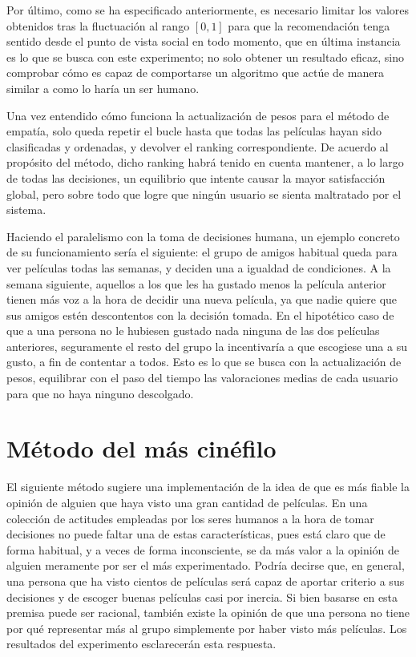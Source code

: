 Por último, como se ha especificado anteriormente, es necesario limitar los valores obtenidos tras la fluctuación al rango $[0,1]$ para que la recomendación tenga sentido desde el punto de vista social en todo momento, que en última instancia es lo que se busca con este experimento; no solo obtener un resultado eficaz, sino comprobar cómo es capaz de comportarse un algoritmo que actúe de manera similar a como lo haría un ser humano.

Una vez entendido cómo funciona la actualización de pesos para el método de empatía, solo queda repetir el bucle hasta que todas las películas hayan sido clasificadas y ordenadas, y devolver el ranking correspondiente. De acuerdo al propósito del método, dicho ranking habrá tenido en cuenta mantener, a lo largo de todas las decisiones, un equilibrio que intente causar la mayor satisfacción global, pero sobre todo que logre que ningún usuario se sienta maltratado por el sistema.

Haciendo el paralelismo con la toma de decisiones humana, un ejemplo concreto de su funcionamiento sería el siguiente: el grupo de amigos habitual queda para ver películas todas las semanas, y deciden una a igualdad de condiciones. A la semana siguiente, aquellos a los que les ha gustado menos la película anterior tienen más voz a la hora de decidir una nueva película, ya que nadie quiere que sus amigos estén descontentos con la decisión tomada. En el hipotético caso de que a una persona no le hubiesen gustado nada ninguna de las dos películas anteriores, seguramente el resto del grupo la incentivaría a que escogiese una a su gusto, a fin de contentar a todos. Esto es lo que se busca con la actualización de pesos, equilibrar con el paso del tiempo las valoraciones medias de cada usuario para que no haya ninguno descolgado.

\section{Método del más cinéfilo}

El siguiente método sugiere una implementación de la idea de que es más fiable la opinión de alguien que haya visto una gran cantidad de películas. En una colección de actitudes empleadas por los seres humanos a la hora de tomar decisiones no puede faltar una de estas características, pues está claro que de forma habitual, y a veces de forma inconsciente, se da más valor a la opinión de alguien meramente por ser el más experimentado. Podría decirse que, en general, una persona que ha visto cientos de películas será capaz de aportar criterio a sus decisiones y de escoger buenas películas casi por inercia. Si bien basarse en esta premisa puede ser racional, también existe la opinión de que una persona no tiene por qué representar más al grupo simplemente por haber visto más películas. Los resultados del experimento esclarecerán esta respuesta.

